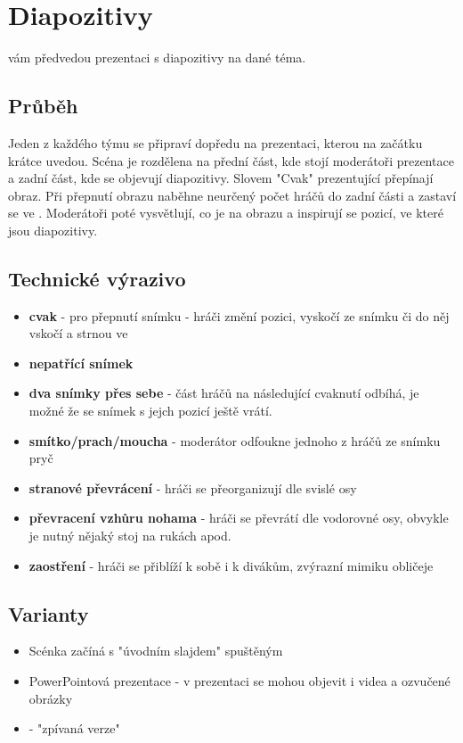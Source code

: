  
 
 
 
\needspace{5cm} \section{Diapozitivy} \label{diapozitivy}  
 
 vám předvedou prezentaci s diapozitivy na dané téma. 
 
\subsection{ Průběh } Jeden  z každého týmu se připraví dopředu na prezentaci, kterou na začátku krátce uvedou. Scéna je rozdělena na přední část, kde stojí moderátoři prezentace a zadní část, kde se objevují diapozitivy. Slovem "Cvak"{} prezentující přepínají obraz. Při přepnutí obrazu naběhne neurčený počet hráčů do zadní části a zastaví se ve . Moderátoři poté vysvětlují, co je na obrazu a inspirují se pozicí, ve které jsou diapozitivy. 
 
\subsection{ Technické výrazivo } \begin{itemize}
\item \textbf{cvak}{} - pro přepnutí snímku  - hráči změní pozici, vyskočí ze snímku či do něj vskočí a strnou ve 
\item \textbf{nepatřící snímek}{}
\item \textbf{dva snímky přes sebe}{} - část hráčů na následující cvaknutí odbíhá, je možné že se snímek s jejch pozicí ještě vrátí.
\item \textbf{smítko/prach/moucha}{} - moderátor odfoukne jednoho z hráčů ze snímku pryč
\item \textbf{stranové převrácení}{} - hráči se přeorganizují dle svislé osy
\item \textbf{převracení vzhůru nohama}{} - hráči se převrátí dle vodorovné osy, obvykle je nutný nějaký stoj na rukách apod.
\item \textbf{zaostření}{} - hráči se přiblíží k sobě i k divákům, zvýrazní mimiku obličeje
\end{itemize}
 
\subsection{ Varianty } \begin{itemize}
\item Scénka začíná s  "úvodním slajdem"{} spuštěným
\item PowerPointová prezentace - v prezentaci se mohou objevit i videa a ozvučené obrázky
\item {} - "zpívaná verze"
\end{itemize}
 
